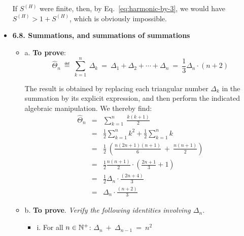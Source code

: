 \begin{itemize}
\smallskip

If $S^{(H)}$ were finite, then, by Eq.~\ref{eq:harmonic-by-3}, we would have $S^{(H)}  > 1 + S^{(H)} $, which is obviously impossible. 


\medskip
\item
{\bf 6.8. Summations, and summations of summations}
\smallskip

  \begin{itemize}
  \item a.
{\bf To prove}: 
\[ \widehat{\Theta}_n \ \eqdef \  \sum_{k=1}^n \ \Delta_k \ = \   
\Delta_1 + \Delta_2 + \cdots + \Delta_n \ = \ \frac{1}{3} \Delta_n \cdot (n+2) \]

The result is obtained by replacing each triangular number $\Delta_k$ in the summation by its explicit expression, and then perform the indicated algebraic manipulation.  We thereby find:
\begin{eqnarray*}
\widehat{\Theta}_n & = & \sum_{k=1}^n \ \frac{k(k+1)}{2} \\
    & = & \frac{1}{2} \sum_{k=1}^n k^2  + \frac{1}{2} \sum_{k=1}^n k  \\
    & = & \frac{1}{2} \ \left( \frac{n (2n+1) (n+1)}{6} \ + \ \frac{n (n+1)}{2} \right)\\
    & = & \frac{1}{2} \frac{n (n+1)}{2} \cdot \left( \frac{2n+1}{3} + 1 \right)  \\
    & = & \frac{1}{2} \Delta_n \cdot \frac{(2n+4)}{3}  \\
    & = & \Delta_n \cdot \frac{(n+2)}{3}
\end{eqnarray*} 


  \item b.
{\bf To prove}.  {\em Verify the following identities involving $\Delta_n$.}

\smallskip

    \begin{itemize}
    \item i.
For all $n \in \mathbb{N}^+$:
$\Delta_n \ + \ \Delta_{n-1} \ = \ n^2$

\smallskip


\end{itemize}
\end{itemize}
\end{itemize}
